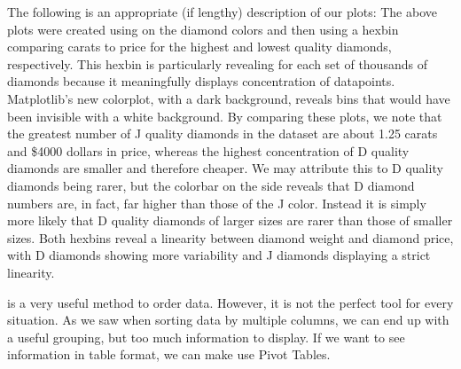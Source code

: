 \begin{problem}

The following is an appropriate (if lengthy) description of our plots:
The above plots were created using  on the diamond colors and then using a hexbin comparing carats to price for the highest and lowest quality diamonds, respectively. 
This hexbin is particularly revealing for each set of thousands of diamonds because it meaningfully displays concentration of datapoints. 
Matplotlib's new  colorplot, with a dark background, reveals bins that would have been invisible with a white background.
By comparing these plots, we note that the greatest number of J quality diamonds in the dataset are about 1.25 carats and \$4000 dollars in price, whereas the highest concentration of D quality diamonds are smaller and therefore cheaper. 
We may attribute this to D quality diamonds being rarer, but the colorbar on the side reveals that D diamond numbers are, in fact, far higher than those of the J color. 
Instead it is simply more likely that D quality diamonds of larger sizes are rarer than those of smaller sizes. 
Both hexbins reveal a linearity between diamond weight and diamond price, with D diamonds showing more variability and J diamonds displaying a strict linearity.

\end{problem}

 is a very useful method to order data.  However, it is not the perfect tool for every situation.  As we saw when sorting data by multiple columns, we can end up with a useful grouping, but too much information to display.  If we want to see information in table format, we can make use Pivot Tables.

